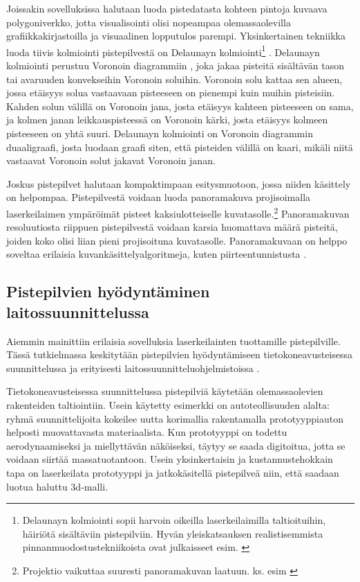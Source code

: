 Joissakin sovelluksissa halutaan luoda pistedatasta kohteen pintoja kuvaava polygoniverkko, jotta visualisointi olisi nopeampaa olemassaolevilla grafiikkakirjastoilla ja visuaalinen lopputulos parempi. Yksinkertainen tekniikka luoda tiivis kolmiointi pistepilvestä on Delaunayn kolmiointi\footnote{Delaunayn kolmiointi sopii harvoin oikeilla laserkeilaimilla taltioituihin, häiriötä sisältäviin pistepilviin. Hyvän yleiskatsauksen realistisemmista pinnanmuodostustekniikoista ovat julkaisseet esim. \cite{berger}} . Delaunayn kolmiointi perustuu Voronoin diagrammiin , joka jakaa pisteitä sisältävän tason tai avaruuden konvekseihin Voronoin soluihin. Voronoin solu kattaa sen alueen, jossa etäisyys solua vastaavaan pisteeseen on pienempi kuin muihin pisteisiin. Kahden solun välillä on Voronoin jana, josta etäisyys kahteen pisteeseen on sama, ja kolmen janan leikkauspisteessä on Voronoin kärki, josta etäisyys kolmeen pisteeseen on yhtä suuri. Delaunayn kolmiointi on Voronoin diagrammin duaaligraafi, josta luodaan graafi siten, että pisteiden välillä on kaari, mikäli niitä vastaavat Voronoin solut jakavat Voronoin janan. \cite{delaunay}

Joskus pistepilvet halutaan kompaktimpaan esitysmuotoon, jossa niiden käsittely on helpompaa. Pistepilvestä voidaan luoda panoramakuva projisoimalla laserkeilaimen ympäröimät pisteet kaksiulotteiselle kuvatasolle.\footnote{Projektio vaikuttaa suuresti panoramakuvan laatuun. ks. esim \cite{proj}} Panoramakuvan resoluutiosta riippuen pistepilvestä voidaan karsia huomattava määrä pisteitä, joiden koko olisi liian pieni projisoituna kuvatasolle. Panoramakuvaan on helppo soveltaa erilaisia kuvankäsittelyalgoritmeja, kuten piirteentunnistusta . 

\subsection{Pistepilvien hyödyntäminen laitossuunnittelussa}

Aiemmin mainittiin erilaisia sovelluksia laserkeilainten tuottamille pistepilville. Tässä tutkielmassa keskitytään pistepilvien hyödyntämiseen tietokoneavusteisessa suunnittelussa  ja erityisesti laitossuunnitteluohjelmistoissa .

Tietokoneavusteisessa suunnittelussa pistepilviä käytetään olemassaolevien rakenteiden taltiointiin. Usein käytetty esimerkki on autoteollisuuden alalta: ryhmä suunnittelijoita kokeilee uutta korimallia rakentamalla prototyyppiauton helposti muovattavasta materiaalista. Kun prototyyppi on todettu aerodynaamiseksi ja miellyttävän näköiseksi, täytyy se saada digitoitua, jotta se voidaan siirtää massatuotantoon. Usein yksinkertaisin ja kustannustehokkain tapa on laserkeilata prototyyppi ja jatkokäsitellä pistepilveä niin, että saadaan luotua haluttu 3d-malli.

